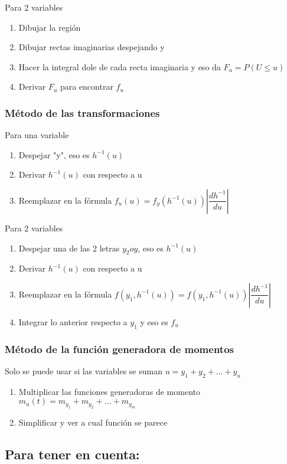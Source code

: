 Para 2 variables
\begin{enumerate}
	\item Dibujar la región
	\item Dibujar rectas imaginarias despejando y
	\item Hacer la integral dole de cada recta imaginaria y eso da $F_u=P(U\leq u)$
	\item Derivar $F_u$ para encontrar $f_u$
\end{enumerate}

\subsubsection{Método de las transformaciones}

Para una variable
\begin{enumerate}
	\item Despejar "y", eso es $h^{-1}(u)$
	\item Derivar $h^{-1}(u)$ con respecto a u
	\item Reemplazar en la fórmula $f_u(u)=f_y(h^{-1}(u))\left| \dfrac{dh^{-1}}{du} \right| $
\end{enumerate}
Para 2 variables
\begin{enumerate}
	\item Despejar una de las 2 letras $y_2 o y$, eso es $h^{-1}(u)$
	\item Derivar $h^{-1}(u)$ con respecto a u
	\item Reemplazar en la fórmula $f(y_1,h^{-1}(u))=f(y_1,h^{-1}(u))\left| \dfrac{dh^{-1}}{du} \right| $
	\item Integrar lo anterior respecto a $y_1$ y eso es $f_u$
\end{enumerate}

\subsubsection{Método de la función generadora de momentos}
Solo se puede usar si las variables se suman $u=y_1+y_2+\dots+y_n$
\begin{enumerate}
	\item Multiplicar las funciones generadoras de momento $m_u(t)=m_{y_1}+m_{y_2}+\dots+m_{y_m}$
	\item Simplificar y ver a cual función se parece
\end{enumerate}
\subsection{Para tener en cuenta:}
